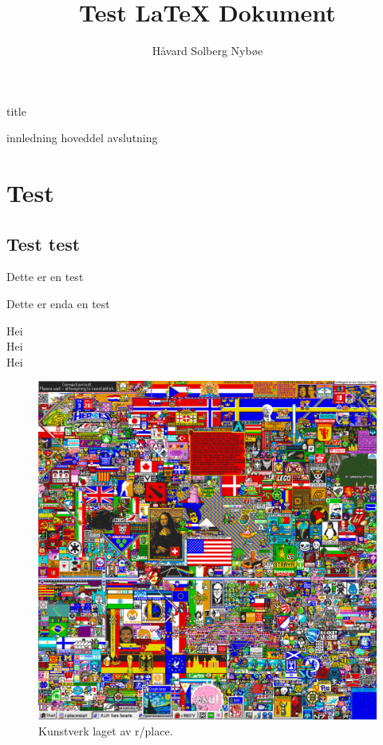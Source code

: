 \documentclass[a4paper, 12pt]{article}
\title{Test {\LaTeX} Dokument}
\author{Håvard Solberg Nybøe}
\begin{document}

{title}
\newpage

\tableofcontents
\listoffigures
\listoftables
\newpage


{innledning}
{hoveddel}
{avslutning}

\section{Test}
\subsection{Test test}
Dette er en test

Dette er enda en test

    Hei \parencite{druckmann2020}\\
    Hei \parencite{druckmann2013}\\
    Hei \parencite{druckmann2014}
    
    \begin{figure}[h]\label{r/place}
        \centering
        \includegraphics[width=.6\textwidth]{img/r_place.png}
        \caption{Kunstverk laget av r/place.}
    \end{figure}
    
    \newpage
    \printbibliography[heading=bibintoc]
    
\end{document}
